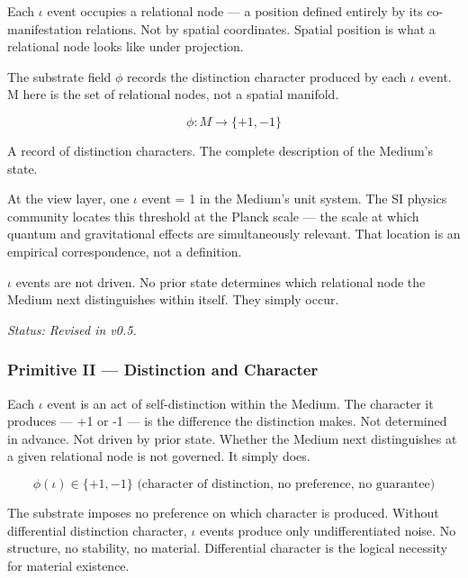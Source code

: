 \documentclass[11pt,letterpaper]{article}
\begin{document}
Each \(\iota\) event occupies a relational node --- a position defined entirely by its co-manifestation relations. Not by spatial coordinates. Spatial position is what a relational node looks like under projection.

The substrate field \(\phi\) records the distinction character produced by each \(\iota\) event. M here is the set of relational nodes, not a spatial manifold.

\begin{equation}
\phi : M \to \{+1, -1\}
\end{equation}

\begin{center}
A record of distinction characters. The complete description of the Medium's state.
\end{center}

At the view layer, one \(\iota\) event = 1 in the Medium's unit system. The SI physics community locates this threshold at the Planck scale --- the scale at which quantum and gravitational effects are simultaneously relevant. That location is an empirical correspondence, not a definition.

\(\iota\) events are not driven. No prior state determines which relational node the Medium next distinguishes within itself. They simply occur.

\emph{Status: Revised in v0.5.}

\subsubsection{Primitive II --- Distinction and Character}
\label{sec:org81acee9}


Each \(\iota\) event is an act of self-distinction within the Medium. The character it produces --- +1 or -1 --- is the difference the distinction makes. Not determined in advance. Not driven by prior state. Whether the Medium next distinguishes at a given relational node is not governed. It simply does.

\begin{equation}
\phi(\iota) \in \{+1, -1\} \text{ (character of distinction, no preference, no guarantee)}
\end{equation}

The substrate imposes no preference on which character is produced. Without differential distinction character, \(\iota\) events produce only undifferentiated noise. No structure, no stability, no material. Differential character is the logical necessity for material existence.
\end{document}
